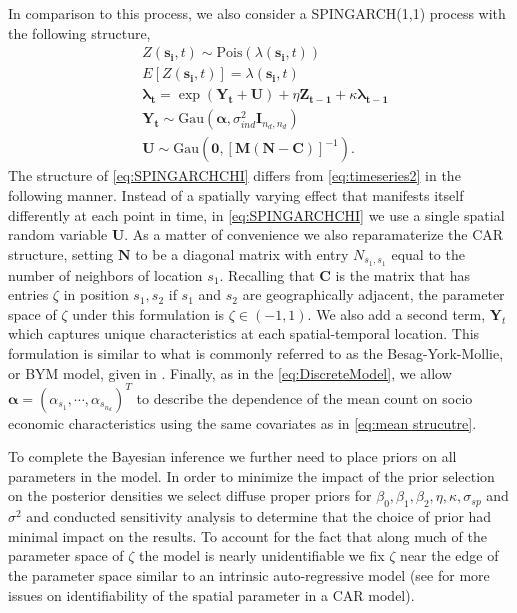 \documentclass[11pt]{isuthesis}
\begin{document}
In comparison to this process, we also consider a SPINGARCH(1,1) process with the following structure,
\begin{align}
	& Z(\boldsymbol{s_i},t) \sim \mbox{Pois}(\lambda(\boldsymbol{s_i},t)) \label{eq:SPINGARCHCHI} \\
	& E[Z(\boldsymbol{s_i},t)]=\lambda(\boldsymbol{s_i},t)\\
	& \boldsymbol{\lambda_t} = \exp(\boldsymbol{Y_t}+\boldsymbol{U})+\eta \boldsymbol{Z_{t-1}}+\kappa \boldsymbol{\lambda_{t-1}}\\
	& \boldsymbol{Y_t} \sim \mbox{Gau}\textit{} (\boldsymbol{\alpha},\sigma_{ind}^2 \boldsymbol{I}_{{n_d},{n_d}})\\
	& \boldsymbol{U} \sim \mbox{Gau} (\boldsymbol{0},[\boldsymbol{M}(\boldsymbol{N}-\boldsymbol{C})]^{-1}).
\end{align}
The structure of \eqref{eq:SPINGARCHCHI} differs from \eqref{eq:timeseries2} in the following manner.  Instead of a spatially varying effect that manifests itself differently at each point in time, in \eqref{eq:SPINGARCHCHI} we use a single spatial random variable $\boldsymbol{U}$.  As a matter of convenience we also reparamaterize the CAR structure, setting $\boldsymbol{N}$ to be a diagonal matrix with entry $N_{s_1,s_1}$ equal to the number of neighbors of location $s_1$.  Recalling that $\boldsymbol{C}$ is the matrix that has entries $\zeta$ in position $s_1,s_2$ if $s_1$ and $s_2$ are geographically adjacent, the parameter space of $\zeta$ under this formulation is $\zeta \in (-1,1)$.  We also add a second term, $\boldsymbol{Y}_t$ which captures unique characteristics at each spatial-temporal location.  This formulation is similar to what is commonly referred to as the Besag-York-Mollie, or BYM model, given in \cite{besag1991bayesian}.  Finally, as in the \eqref{eq:DiscreteModel}, we allow $\boldsymbol{\alpha}=(\alpha_{s_1},\cdots,\alpha_{s_{n_d}})^T$ to describe the dependence of the mean count on socio economic characteristics using the same covariates as in \eqref{eq:mean strucutre}.

To complete the Bayesian inference we further need to place priors on all parameters in the model.  In order to minimize the impact of the prior selection on the posterior densities we select diffuse proper priors for $\beta_0,\beta_1,\beta_2,\eta,\kappa,\sigma_{sp}$ and $\sigma^2$ and conducted sensitivity analysis to determine that the choice of prior had minimal impact on the results. To account for the fact that along much of the parameter space of $\zeta$ the model is nearly unidentifiable we fix $\zeta$ near the edge of the parameter space similar to an intrinsic auto-regressive model (see \cite{wall2004close} for more issues on identifiability of the spatial parameter in a CAR model).
\end{document}
